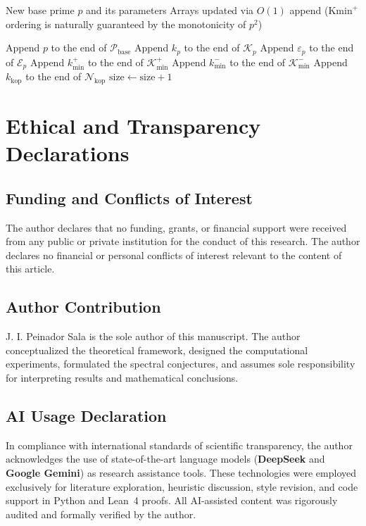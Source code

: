 \documentclass{article}
\numberwithin{equation}{section}
\theoremstyle{plain}
\theoremstyle{definition}
\begin{document}
\begin{algorithm}[htbp]
\caption{AppendBasePrimePM($p$, $k_p$, $\varepsilon_p$, $k_{\min}^+$, $k_{\min}^-$, $k_{\text{kop}}$)}
\label{alg:insert_primo_base_pm}
\begin{algorithmic}[1]
\Require New base prime $p$ and its parameters
\Ensure Arrays updated via $O(1)$ append ($\mathrm{Kmin}^+$ ordering is naturally guaranteed by the monotonicity of $p^2$)

\State Append $p$ to the end of $\mathcal{P}_{\text{base}}$
\State Append $k_p$ to the end of $\mathcal{K}_p$
\State Append $\varepsilon_p$ to the end of $\mathcal{E}_p$
\State Append $k_{\min}^+$ to the end of $\mathcal{K}_{\min}^+$
\State Append $k_{\min}^-$ to the end of $\mathcal{K}_{\min}^-$
\State Append $k_{\text{kop}}$ to the end of $\mathcal{N}_{\text{kop}}$
\State $\text{size} \gets \text{size} + 1$
\end{algorithmic}
\end{algorithm}

\clearpage


\section*{Ethical and Transparency Declarations}

\subsection*{Funding and Conflicts of Interest}
The author declares that no funding, grants, or financial support were received from any public or private institution for the conduct of this research. The author declares no financial or personal conflicts of interest relevant to the content of this article.

\subsection*{Author Contribution}
J. I. Peinador Sala is the sole author of this manuscript. The author conceptualized the theoretical framework, designed the computational experiments, formulated the spectral conjectures, and assumes sole responsibility for interpreting results and mathematical conclusions.

\subsection*{AI Usage Declaration}
In compliance with international standards of scientific transparency, the author acknowledges the use of state-of-the-art language models (\textbf{DeepSeek} and \textbf{Google Gemini}) as research assistance tools. These technologies were employed exclusively for literature exploration, heuristic discussion, style revision, and code support in Python and Lean~4 proofs. All AI-assisted content was rigorously audited and formally verified by the author.
\end{document}

